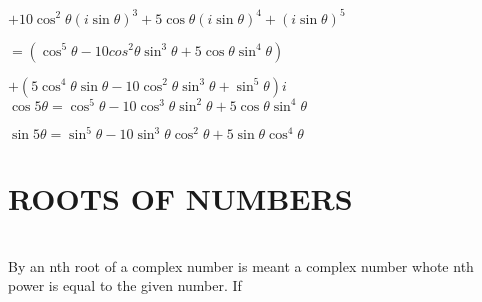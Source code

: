 \documentclass[15pt]{amsbook}
\begin{document}
    $+10\cos^2\theta(i\sin\theta)^3+5\cos\theta(i\sin\theta)^4+(i\sin\theta)^5$
    
    $=(\cos^5\theta-10cos^2\theta \sin^3\theta+ 5\cos\theta \sin^4\theta)$
    
    $+(5\cos^4\theta\sin\theta-10\cos^2\theta\sin^3\theta+\sin^5\theta)i$\\
    
    $\cos5\theta = \cos^5\theta - 10 \cos^3\theta\sin^2\theta+5\cos\theta\sin^4\theta$
    
    $\sin5\theta = \sin^5\theta - 10 \sin^3\theta\cos^2\theta+5\sin\theta\cos^4\theta$\\
    \section{ROOTS OF NUMBERS}
    \\
    By an nth root of a complex number is meant a complex number whote nth power is equal to the given number. If






\end{document}
